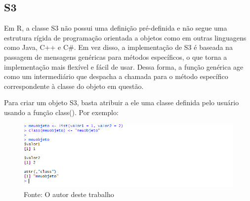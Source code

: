 	\subsection{S3}
		Em R, a classe S3 não possui uma definição pré-definida e não segue uma estrutura rígida de programação orientada a objetos como em outras linguagens como Java, C++ e C\#. Em vez disso, a implementação de S3 é baseada na passagem de mensagens genéricas para métodos específicos, o que torna a implementação mais flexível e fácil de usar. Dessa forma, a função genérica age como um intermediário que despacha a chamada para o método específico correspondente à classe do objeto em questão.\par 
		Para criar um objeto S3, basta atribuir a ele uma classe definida pelo usuário usando a função class(). Por exemplo:\begin{figure}[H]
			\centering
			\caption{}
			\includegraphics[width=1.0\linewidth]{Prints/screenshot014}
			\label{fig:screenshot014}
			{\tiny \sf Fonte: O autor deste trabalho }
		\end{figure}
